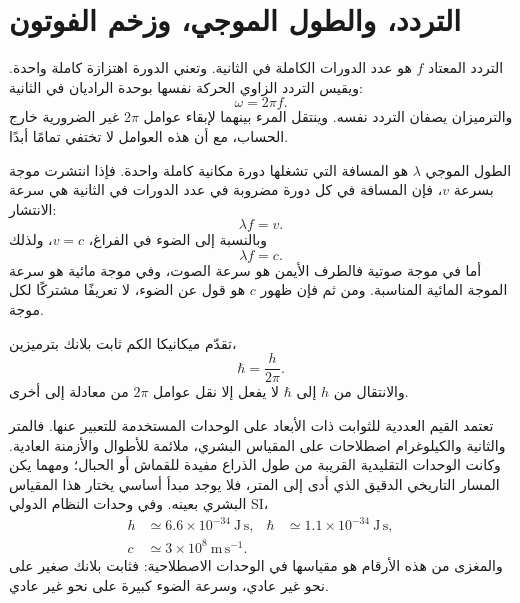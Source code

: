 \section{التردد، والطول الموجي، وزخم الفوتون}

التردد المعتاد \(f\) هو عدد الدورات الكاملة في الثانية. وتعني الدورة اهتزازة كاملة واحدة. ويقيس التردد الزاوي الحركة نفسها بوحدة الراديان في الثانية:
\begin{equation}
\omega=2\pi f.
\end{equation}
والترميزان يصفان التردد نفسه. وينتقل المرء بينهما لإبقاء عوامل \(2\pi\) غير الضرورية خارج الحساب، مع أن هذه العوامل لا تختفي تمامًا أبدًا.

الطول الموجي \(\lambda\) هو المسافة التي تشغلها دورة مكانية كاملة واحدة. فإذا انتشرت موجة بسرعة \(v\)، فإن المسافة في كل دورة مضروبة في عدد الدورات في الثانية هي سرعة الانتشار:
\begin{equation}
\lambda f=v.
\end{equation}
وبالنسبة إلى الضوء في الفراغ، \(v=c\)، ولذلك
\begin{equation}
\lambda f=c.
\end{equation}
أما في موجة صوتية فالطرف الأيمن هو سرعة الصوت، وفي موجة مائية هو سرعة الموجة المائية المناسبة. ومن ثم فإن ظهور \(c\) هو قول عن الضوء، لا تعريفًا مشتركًا لكل موجة.

تقدّم ميكانيكا الكم ثابت بلانك بترميزين،
\begin{equation}
\hbar=\frac{h}{2\pi}.
\end{equation}
والانتقال من \(h\) إلى \(\hbar\) لا يفعل إلا نقل عوامل \(2\pi\) من معادلة إلى أخرى.

تعتمد القيم العددية للثوابت ذات الأبعاد على الوحدات المستخدمة للتعبير عنها. فالمتر والثانية والكيلوغرام اصطلاحات على المقياس البشري، ملائمة للأطوال والأزمنة العادية. وكانت الوحدات التقليدية القريبة من طول الذراع مفيدة للقماش أو الحبال؛ ومهما يكن المسار التاريخي الدقيق الذي أدى إلى المتر، فلا يوجد مبدأ أساسي يختار هذا المقياس البشري بعينه. وفي وحدات النظام الدولي SI،
\begin{equation}
\begin{aligned}
h &\simeq 6.6\times10^{-34}\ \mathrm{J\,s},
&\hbar &\simeq 1.1\times10^{-34}\ \mathrm{J\,s},\\
c &\simeq 3\times10^8\ \mathrm{m\,s^{-1}}.
\end{aligned}
\end{equation}
والمغزى من هذه الأرقام هو مقياسها في الوحدات الاصطلاحية: فثابت بلانك صغير على نحو غير عادي، وسرعة الضوء كبيرة على نحو غير عادي.


